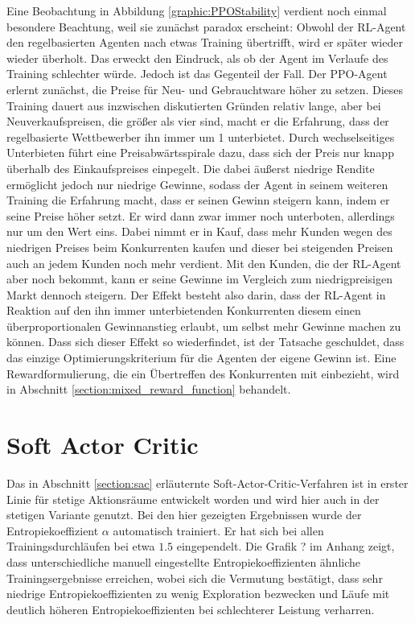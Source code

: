 Eine Beobachtung in Abbildung \ref{graphic:PPOStability} verdient noch einmal besondere Beachtung, weil sie zunächst paradox erscheint:
Obwohl der RL-Agent den regelbasierten Agenten nach etwas Training übertrifft, wird er später wieder wieder überholt.
Das erweckt den Eindruck, als ob der Agent im Verlaufe des Training schlechter würde.
Jedoch ist das Gegenteil der Fall.
Der PPO-Agent erlernt zunächst, die Preise für Neu- und Gebrauchtware höher zu setzen.
Dieses Training dauert aus inzwischen diskutierten Gründen relativ lange, aber bei Neuverkaufspreisen, die größer als vier sind, macht er die Erfahrung, dass der regelbasierte Wettbewerber ihn immer um 1 unterbietet.
Durch wechselseitiges Unterbieten führt eine Preisabwärtsspirale dazu, dass sich der Preis nur knapp überhalb des Einkaufspreises einpegelt.
Die dabei äußerst niedrige Rendite ermöglicht jedoch nur niedrige Gewinne, sodass der Agent in seinem weiteren Training die Erfahrung macht, dass er seinen Gewinn steigern kann, indem er seine Preise höher setzt.
Er wird dann zwar immer noch unterboten, allerdings nur um den Wert eins.
Dabei nimmt er in Kauf, dass mehr Kunden wegen des niedrigen Preises beim Konkurrenten kaufen und dieser bei steigenden Preisen auch an jedem Kunden noch mehr verdient.
Mit den Kunden, die der RL-Agent aber noch bekommt, kann er seine Gewinne im Vergleich zum niedrigpreisigen Markt dennoch steigern.
Der Effekt besteht also darin, dass der RL-Agent in Reaktion auf den ihn immer unterbietenden Konkurrenten diesem einen überproportionalen Gewinnanstieg erlaubt, um selbst mehr Gewinne machen zu können.
Dass sich dieser Effekt so wiederfindet, ist der Tatsache geschuldet, dass das einzige Optimierungskriterium für die Agenten der eigene Gewinn ist.
Eine Rewardformulierung, die ein Übertreffen des Konkurrenten mit einbezieht, wird in Abschnitt \ref{section:mixed_reward_function} behandelt.

\section{Soft Actor Critic}
\label{section:main_sac}
Das in Abschnitt \ref{section:sac} erläuternte Soft-Actor-Critic-Verfahren ist in erster Linie für stetige Aktionsräume entwickelt worden und wird hier auch in der stetigen Variante genutzt.
Bei den hier gezeigten Ergebnissen wurde der Entropiekoeffizient $\alpha$ automatisch trainiert.
Er hat sich bei allen Trainingsdurchläufen bei etwa $1.5$ eingependelt.
Die Grafik ? im Anhang zeigt, dass unterschiedliche manuell eingestellte Entropiekoeffizienten ähnliche Trainingsergebnisse erreichen, wobei sich die Vermutung bestätigt, dass sehr niedrige Entropiekoeffizienten zu wenig Exploration bezwecken und Läufe mit deutlich höheren Entropiekoeffizienten bei schlechterer Leistung verharren.


